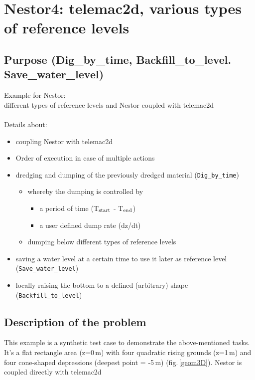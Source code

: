 \chapter{Nestor4: telemac2d, various types of reference levels }
%
%
\section{Purpose (Dig\_by\_time, Backfill\_to\_level. Save\_water\_level)}
%
Example for Nestor:\\
different types of reference levels and Nestor coupled with telemac2d\\
\\
Details about:
\begin{itemize}
  \item coupling Nestor with telemac2d
  \item Order of execution in case of multiple actions
  \item dredging and dumping of the previously dredged material (\texttt{Dig\_by\_time})
  \begin{itemize}
     \item whereby the dumping is controlled by
     \begin{itemize}
        \item a period of time (T$_{\rm{start}}$ - T$_{\rm{end}}$)
        \item a user defined dump rate (dz/dt)
     \end{itemize}
     \item dumping below different types of reference levels
  \end{itemize}
  \item saving a water level at a certain time to use it later as reference level (\texttt{Save\_water\_level})
  \item locally raising the bottom to a defined (arbitrary) shape (\texttt{Backfill\_to\_level})
\end{itemize}

\newpage
\section{Description of the problem}
This example is a synthetic test case to demonstrate the above-mentioned tasks.
It's a flat rectangle area (z=0\,m) with four quadratic rising grounds (z=1\,m) and four cone-shaped
depressions (deepest point = -5\,m) (fig.\,\ref{geom3D}).
Nestor is coupled directly with telemac2d

